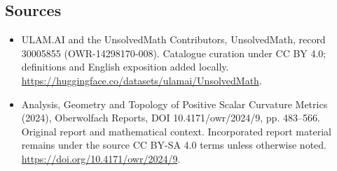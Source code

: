 \documentclass[11pt]{article}
\begin{document}
\subsection{Sources}
\begin{itemize}
\item[\hypertarget{source:30005855:1}{S1}] ULAM.AI and the UnsolvedMath Contributors, UnsolvedMath, record 30005855 (OWR-14298170-008). Catalogue curation under CC BY 4.0; definitions and English exposition added locally.
\url{https://huggingface.co/datasets/ulamai/UnsolvedMath}.
\item[\hypertarget{source:30005855:2}{S2}] Analysis, Geometry and Topology of Positive Scalar Curvature Metrics (2024), Oberwolfach Reports, DOI 10.4171/owr/2024/9, pp. 483--566. Original report and mathematical context. Incorporated report material remains under the source CC BY-SA 4.0 terms unless otherwise noted.
\url{https://doi.org/10.4171/owr/2024/9}.
\end{itemize}
\label{end:30005855}
\end{document}
